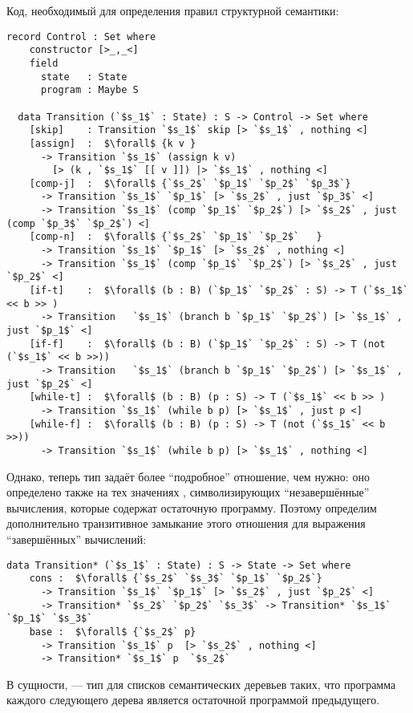   Код, необходимый для определения правил структурной семантики:
  \begin{lstlisting}[mathescape]
  record Control : Set where
    constructor [>_,_<]
    field
      state   : State
      program : Maybe S

  data Transition (`$s_1$` : State) : S -> Control -> Set where
    [skip]    : Transition `$s_1$` skip [> `$s_1$` , nothing <]
    [assign]  :  $\forall$ {k v }
      -> Transition `$s_1$` (assign k v)
        [> (k , `$s_1$` [[ v ]]) |> `$s_1$` , nothing <]
    [comp-j]  :  $\forall$ {`$s_2$` `$p_1$` `$p_2$` `$p_3$`}
      -> Transition `$s_1$` `$p_1$` [> `$s_2$` , just `$p_3$` <]
      -> Transition `$s_1$` (comp `$p_1$` `$p_2$`) [> `$s_2$` , just (comp `$p_3$` `$p_2$`) <]
    [comp-n]  :  $\forall$ {`$s_2$` `$p_1$` `$p_2$`   }
      -> Transition `$s_1$` `$p_1$` [> `$s_2$` , nothing <]
      -> Transition `$s_1$` (comp `$p_1$` `$p_2$`) [> `$s_2$` , just `$p_2$` <]
    [if-t]    :  $\forall$ (b : B) (`$p_1$` `$p_2$` : S) -> T (`$s_1$` << b >> )
      -> Transition   `$s_1$` (branch b `$p_1$` `$p_2$`) [> `$s_1$` , just `$p_1$` <]
    [if-f]    :  $\forall$ (b : B) (`$p_1$` `$p_2$` : S) -> T (not (`$s_1$` << b >>))
      -> Transition   `$s_1$` (branch b `$p_1$` `$p_2$`) [> `$s_1$` , just `$p_2$` <]
    [while-t] :  $\forall$ (b : B) (p : S) -> T (`$s_1$` << b >> )
      -> Transition `$s_1$` (while b p) [> `$s_1$` , just p <]
    [while-f] :  $\forall$ (b : B) (p : S) -> T (not (`$s_1$` << b >>))
      -> Transition `$s_1$` (while b p) [> `$s_1$` , nothing <]
  \end{lstlisting}

  Однако, теперь тип  задаёт более ``подробное'' отношение, чем нужно: оно определено также на тех значениях , символизирующих ``незавершённые'' вычисления, которые содержат остаточную программу. Поэтому определим дополнительно транзитивное замыкание этого отношения  для выражения ``завершённых'' вычислений:
  \begin{lstlisting}[mathescape]
  data Transition* (`$s_1$` : State) : S -> State -> Set where
    cons :  $\forall$ {`$s_2$` `$s_3$` `$p_1$` `$p_2$`}
      -> Transition `$s_1$` `$p_1$` [> `$s_2$` , just `$p_2$` <]
      -> Transition* `$s_2$` `$p_2$` `$s_3$` -> Transition* `$s_1$` `$p_1$` `$s_3$`
    base :  $\forall$ {`$s_2$` p}
      -> Transition `$s_1$` p  [> `$s_2$` , nothing <]
      -> Transition* `$s_1$` p  `$s_2$`
  \end{lstlisting}
  В сущности,  --- тип для списков семантических деревьев таких, что программа каждого следующего дерева является остаточной программой предыдущего.

